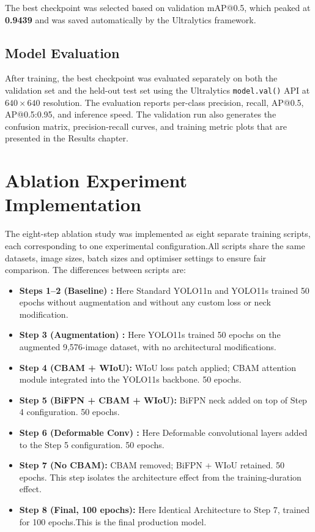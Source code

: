 The best checkpoint was selected based on validation mAP@0.5, which peaked at \textbf{0.9439} and was saved automatically by the Ultralytics framework.

\subsection{Model Evaluation}

After training, the best checkpoint was evaluated separately on both the validation set and the held-out test set using the Ultralytics \texttt{model.val()} API at $640\times640$ resolution. The evaluation reports per-class precision, recall, AP@0.5, AP@0.5:0.95, and inference speed. The validation run also generates the confusion matrix, precision-recall curves, and training metric plots that are presented in the Results chapter.

\section{Ablation Experiment Implementation}

The eight-step ablation study was implemented as eight separate training scripts, each corresponding to one experimental configuration.All scripts share the same datasets, image sizes, batch sizes and optimiser settings to ensure fair comparison. The differences between scripts are:

\begin{itemize}
    \item \textbf{Steps 1--2 (Baseline) :} Here Standard YOLO11n and YOLO11s trained 50 epochs without augmentation and without any custom loss or neck modification.
    \item \textbf{Step 3 (Augmentation) :} Here YOLO11s trained 50 epochs on the augmented 9,576-image dataset, with no architectural modifications.
    \item \textbf{Step 4 (CBAM + WIoU):} WIoU loss patch applied; CBAM attention module integrated into the YOLO11s backbone. 50 epochs.
    \item \textbf{Step 5 (BiFPN + CBAM + WIoU):} BiFPN neck added on top of Step 4 configuration. 50 epochs.
    \item \textbf{Step 6 (Deformable Conv) :} Here Deformable convolutional layers added to the Step 5 configuration. 50 epochs.
    \item \textbf{Step 7 (No CBAM):} CBAM removed; BiFPN + WIoU retained. 50 epochs. This step isolates the architecture effect from the training-duration effect.
    \item \textbf{Step 8 (Final, 100 epochs):} Here Identical Architecture to Step 7, trained for 100 epochs.This is the final production model.
\end{itemize}

